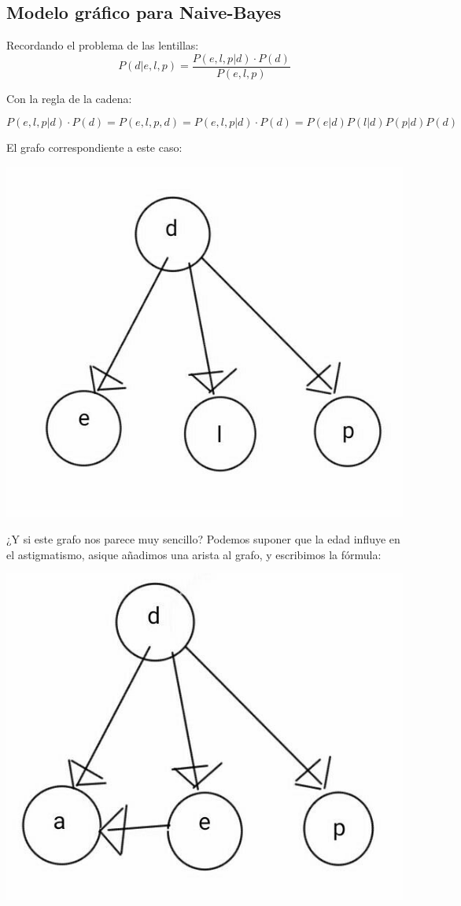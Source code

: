 \documentclass{apuntes}
\begin{document}
\subsection{Modelo gráfico para Naive-Bayes}
Recordando el problema de las lentillas:
\[P(d|e,l,p) = \frac{P(e,l,p|d)·P(d)}{P(e,l,p)}\]

Con la regla de la cadena:

\[
P(e,l,p|d)·P(d) = P(e,l,p,d) = P(e,l,p|d)·P(d) = P(e|d)P(l|d)P(p|d)P(d)
\]

El grafo correspondiente a este caso:


\includegraphics[scale=0.5]{img/grafo2.jpg}

¿Y si este grafo nos parece muy sencillo? Podemos suponer que la edad influye en el astigmatismo, asique añadimos una arista al grafo, y escribimos la fórmula:

\includegraphics[scale=0.5]{img/grafo3.jpg}
\end{document}
